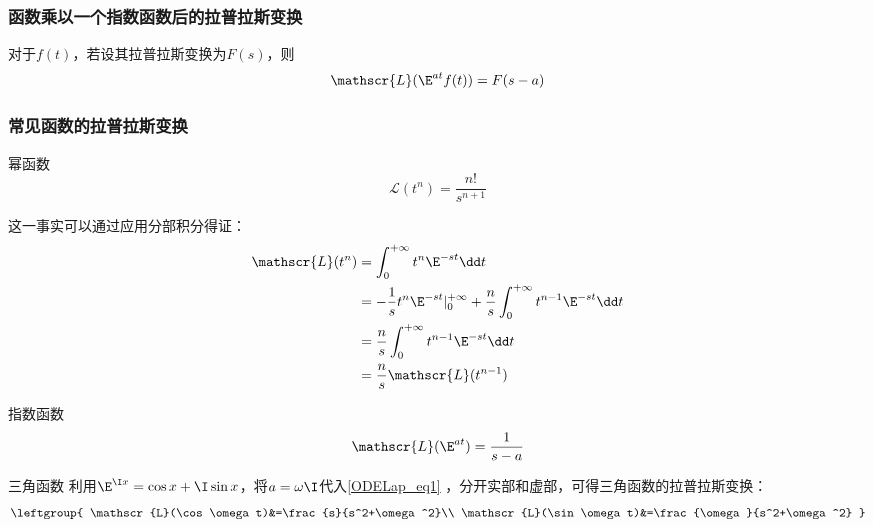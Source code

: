 \subsubsection{函数乘以一个指数函数后的拉普拉斯变换}




\begin{theorem}{}\label{ODELap_the2}
对于$f(t)$，若设其拉普拉斯变换为$F(s)$，则
\begin{equation}
\mathscr{L}(\E^{at}f(t))=F(s-a)
\end{equation}
\end{theorem}









\subsubsection{常见函数的拉普拉斯变换}

\begin{example}{幂函数}
\begin{equation}\label{ODELap_eq11}
\mathscr{L}(t^n)=\frac{n!}{s^{n+1}}
\end{equation}

这一事实可以通过应用分部积分得证：
\begin{equation}\label{ODELap_eq2}
\begin{aligned}
\mathscr{L}(t^n)&=\int_0^{+\infty}t^n\E^{-st}\dd t\\
&=-\frac{1}{s}t^n\E^{-st}|^{+\infty}_0+\frac{n}{s}\int_0^{+\infty}t^{n-1}\E^{-st}\dd t\\
&=\frac{n}{s}\int_0^{+\infty}t^{n-1}\E^{-st}\dd t\\
&=\frac{n}{s}\mathscr{L}(t^{n-1})
\end{aligned}
\end{equation}
\end{example}

\begin{example}{指数函数}
\begin{equation}\label{ODELap_eq1}
\mathscr{L}(\E^{at})=\frac{1}{s-a}
\end{equation}

\end{example}

\begin{example}{三角函数}
利用$\E^{\I x}=\cos x+\I\sin x$，将$a=\omega\I$代入\autoref{ODELap_eq1} ，分开实部和虚部，可得三角函数的拉普拉斯变换：
\begin{equation}\label{ODELap_eq3}
\leftgroup{
    \mathscr{L}(\cos \omega t)&=\frac{s}{s^2+\omega^2}\\
    \mathscr{L}(\sin \omega t)&=\frac{\omega}{s^2+\omega^2}
}
\end{equation}
\end{example}


